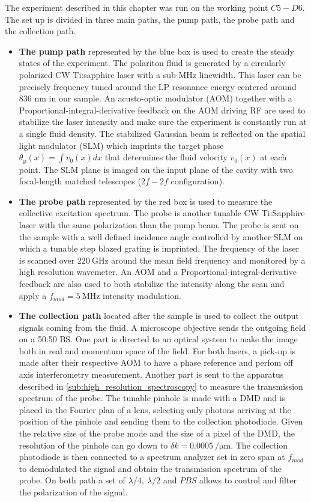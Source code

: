  The experiment described in this chapter was run on the working point $C5-D6$.
 The set up is divided in three main paths, the pump path, the probe path and the collection path.


 \begin{itemize}
    \item \textbf{The pump path} represented by the blue box is used to create the steady states of the experiment. The polariton fluid is generated by a circularly polarized CW Ti:sapphire laser with a sub-MHz linewidth. This laser can be precisely frequency tuned around the LP resonance energy centered around 836 nm in our sample. An acusto-optic modulator (AOM) 
    together with a Proportional-integral-derivative feedback on the AOM driving RF are used to stabilize the laser intensity and make sure the experiment is constantly run at a single fluid density.
    The stabilized Gaussian beam is reflected on the spatial light modulator (SLM) which imprints the target phase $\theta_\mathrm{p}(x)=\int v_0(x)dx$ that determines the fluid velocity $v_0(x)$ at each point. The SLM plane is imaged on the input plane of the cavity with two focal-length matched telescopes ($2f-2f$ configuration).
    \item \textbf{The probe path} represented by the red box is used to measure the collective excitation spectrum. The probe is another tunable CW Ti:Sapphire laser with the same polarization than the pump beam. The probe is sent on the sample with a well defined incidence angle controlled by another SLM on which a tunable step blazed grating is imprinted. The frequency of
    the laser is scanned over $\SI{220}{\giga\hertz}$ around the mean field frequency and monitored by a high resolution wavemeter. An AOM and a Proportional-integral-derivative feedback are also used to both stabilize the intensity along the scan and apply a $f_{mod}=\SI{5}{\mega\hertz}$ intensity modulation.
    \item \textbf{The collection path} located after the sample is used to collect the output signals coming from the fluid. A microscope objective sends the outgoing field on a 50:50 BS. One part is directed to an optical system to make the image both in real and momentum space of the field. For both lasers, a pick-up is made after their respective AOM to have a phase reference and perfom off axis interferometry measurement. Another part is sent to the apparatus described in \autoref{sub:high_resolution_spectroscopy} to measure the transmission spectrum of the probe. The tunable
    pinhole is made with a DMD and is placed in the Fourier plan of a lens, selecting only photons arriving at the position of the pinhole and sending them to the collection photodiode. Given 
    the relative size of the probe mode and the size of a pixel of the DMD, the resolution of the pinhole can go down to $\delta k = \SI{0.0005}{\per \micro\meter}$. The collection photodiode is then connected to a spectrum analyzer set in zero span at $f_{mod}$ to demodulated the signal and obtain the transmission spectrum of the probe. On both path
    a set of $\lambda/4,\ \lambda/2$ and $PBS$ allows to control and filter the polarization of the signal.  
 \end{itemize}

